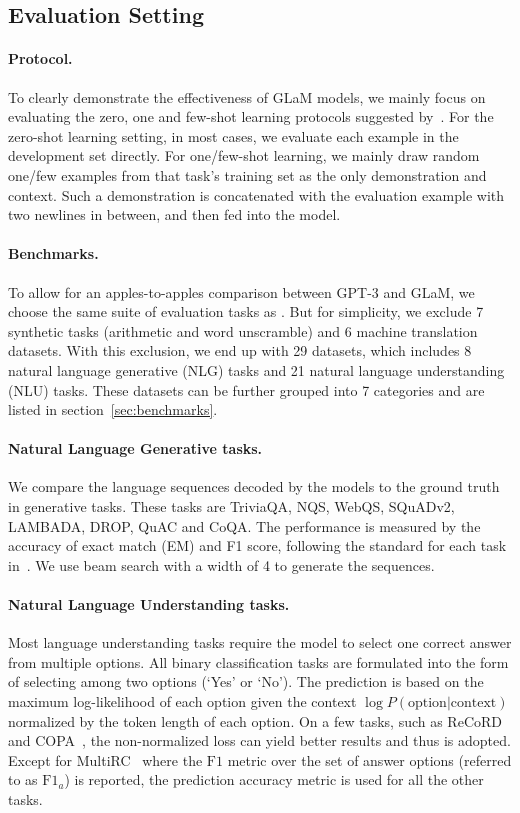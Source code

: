 \subsection{Evaluation Setting}\label{sec:eval_setting}
\paragraph{Protocol.} To clearly demonstrate the effectiveness of GLaM models, we mainly focus on evaluating the zero, one and few-shot learning protocols suggested by~\citet{radford2019language,NEURIPS2020_gpt3}. For the zero-shot learning setting, in most cases, we evaluate each example in the development set directly. For one/few-shot learning, we mainly draw random one/few examples from that task's training set as the only demonstration and context. Such a demonstration is concatenated with the evaluation example with two newlines in between, and then fed into the model.

\paragraph{Benchmarks.} To allow for an apples-to-apples comparison between GPT-3 and GLaM, we choose the same suite of evaluation tasks as \citet{NEURIPS2020_gpt3}. 
But for simplicity, we exclude 7 synthetic tasks (arithmetic and word unscramble) and 6 machine translation datasets. With this exclusion, we end up with 29 datasets, which includes 8 natural language generative (NLG) tasks and 21 natural language understanding (NLU) tasks. These datasets can be further grouped into 7 categories and are listed in section~\ref{sec:benchmarks}.  

\paragraph{Natural Language Generative tasks.} We compare the language sequences decoded by the models to the ground truth in generative tasks. These tasks are TriviaQA, NQS, WebQS, SQuADv2, LAMBADA, DROP, QuAC and CoQA. The performance is measured by the accuracy of exact match (EM) and F1 score, following the standard for each task in~\citet{NEURIPS2020_gpt3}. We use beam search with a width of 4 to generate the sequences. 

\paragraph{Natural Language Understanding tasks.} Most language understanding tasks require the model to select one correct answer from multiple options. All binary classification tasks are formulated into the form of selecting among two options (`Yes' or `No'). The prediction is based on the maximum log-likelihood of each option given the context $\log{P(\text{option}|\text{context})}$ normalized by the token length of each option. On a few tasks, such as ReCoRD~\cite{record2018} and COPA~\cite{COPA2012}, the non-normalized loss can yield better results and thus is adopted. Except for MultiRC~\cite{multirc2018} where the $\text{F1}$ metric over the set of answer options (referred to as $\text{F1}_a$) is reported, the prediction accuracy metric is used for all the other tasks.

